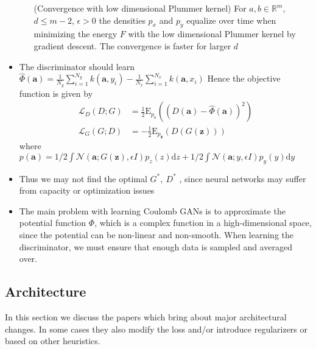\begin{itemize}
\begin{itemize}
        \begin{theorem} (Convergence with low dimensional Plummer kernel) For $a,b \in \mathbb{R}^m$, $d \leq m-2$, $\epsilon > 0$ the densities $p_x$ and $p_y$ equalize over time when minimizing the energy $F$ with the low dimensional Plummer kernel by gradient descent. The convergence is faster for larger $d$
        \end{theorem}
    \end{itemize}
    \item The discriminator should learn $\hat{\Phi}(\boldsymbol{a})=\frac{1}{N_{y}} \sum_{i=1}^{N_{y}} k\left(\boldsymbol{a}, y_{i}\right)-\frac{1}{N_{x}} \sum_{i=1}^{N_{x}} k\left(\boldsymbol{a}, x_{i}\right)$ Hence the objective function is given by
   $$
\begin{aligned} \mathcal{L}_{D}(D ; G) &=\frac{1}{2} \mathrm{E}_{p_{a}}\left((D(\boldsymbol{a})-\hat{\Phi}(\boldsymbol{a}))^{2}\right) \\ \mathcal{L}_{G}(G ; D) &=-\frac{1}{2} \mathrm{E}_{p_{\boldsymbol{z}}}(D(G(\boldsymbol{z}))) \end{aligned}
$$
where $p(\boldsymbol{a})=1 / 2 \int \mathcal{N}(\boldsymbol{a} ; G(\boldsymbol{z}), \epsilon I) p_{z}(z) \mathrm{d} z+1 / 2 \int \mathcal{N}(\boldsymbol{a} ; y, \epsilon I) p_{y}(y) \mathrm{d} y$
    \item Thus we may not find the optimal $G^*, \ D^*$ , since  neural networks may suffer from capacity or optimization issues
    \item The main problem with learning Coulomb GANs is to approximate the potential function $\Phi$, which is a complex function in a high-dimensional space, since the potential can be non-linear and non-smooth.  When learning the discriminator,  we must ensure that enough data is sampled and averaged over.
\end{itemize}{}
\subsection{Architecture} \label{subsec:arch}
In this section we discuss the papers which bring about major architectural changes. In some cases they also modify the loss and/or introduce regularizers or based on other heuristics. 
